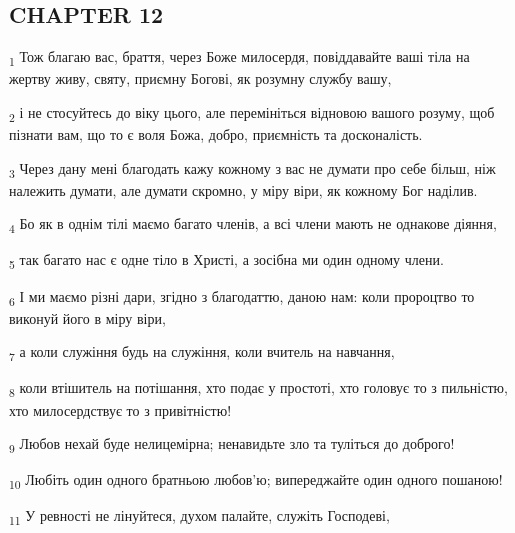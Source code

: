 \subsection{CHAPTER 12}
\begin{tcolorbox}
\textsubscript{1} Тож благаю вас, браття, через Боже милосердя, повіддавайте ваші тіла на жертву живу, святу, приємну Богові, як розумну службу вашу,
\end{tcolorbox}
\begin{tcolorbox}
\textsubscript{2} і не стосуйтесь до віку цього, але перемініться відновою вашого розуму, щоб пізнати вам, що то є воля Божа, добро, приємність та досконалість.
\end{tcolorbox}
\begin{tcolorbox}
\textsubscript{3} Через дану мені благодать кажу кожному з вас не думати про себе більш, ніж належить думати, але думати скромно, у міру віри, як кожному Бог наділив.
\end{tcolorbox}
\begin{tcolorbox}
\textsubscript{4} Бо як в однім тілі маємо багато членів, а всі члени мають не однакове діяння,
\end{tcolorbox}
\begin{tcolorbox}
\textsubscript{5} так багато нас є одне тіло в Христі, а зосібна ми один одному члени.
\end{tcolorbox}
\begin{tcolorbox}
\textsubscript{6} І ми маємо різні дари, згідно з благодаттю, даною нам: коли пророцтво то виконуй його в міру віри,
\end{tcolorbox}
\begin{tcolorbox}
\textsubscript{7} а коли служіння будь на служіння, коли вчитель на навчання,
\end{tcolorbox}
\begin{tcolorbox}
\textsubscript{8} коли втішитель на потішання, хто подає у простоті, хто головує то з пильністю, хто милосердствує то з привітністю!
\end{tcolorbox}
\begin{tcolorbox}
\textsubscript{9} Любов нехай буде нелицемірна; ненавидьте зло та туліться до доброго!
\end{tcolorbox}
\begin{tcolorbox}
\textsubscript{10} Любіть один одного братньою любов'ю; випереджайте один одного пошаною!
\end{tcolorbox}
\begin{tcolorbox}
\textsubscript{11} У ревності не лінуйтеся, духом палайте, служіть Господеві,
\end{tcolorbox}
